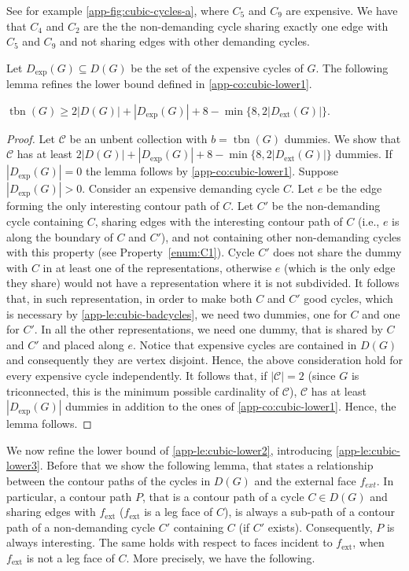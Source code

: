 \documentclass[runningheads]{llncs}
\newcommand{\tbn}{\operatorname{tbn}}
\newcommand{\ext}{\operatorname{ext}}
\begin{document}
See for example \cref{app-fig:cubic-cycles-a}, where $C_5$ and $C_9$ are expensive. We have that $C_4$ and $C_2$ are the the non-demanding cycle sharing exactly one edge with $C_5$ and $C_9$ and not sharing edges with other demanding cycles.

Let $D_{\exp}(G)\subseteq D(G)$ be the set of the expensive cycles of $G$. 
The following lemma refines the lower bound defined in \cref{app-co:cubic-lower1}.

\begin{lemma}
\label{app-le:cubic-lower2}
	$\tbn(G)\ge 2|D(G)|+|D_{\exp}(G)|+8-\min\{8, 2|D_{\ext}(G)|\}$.
\end{lemma}
\begin{proof}
Let $\mathcal{C}$ be an unbent collection with $b=\tbn(G)$ dummies.  We show that $\mathcal{C}$ has at least $2|D(G)|+|D_{\exp}(G)|+8-\min\{8, 2|D_{\ext}(G)|\}$ dummies. 
If $|D_{\exp}(G)|=0$ the lemma follows by 
\cref{app-co:cubic-lower1}. Suppose  $|D_{\exp}(G)|>0$.
Consider an expensive demanding cycle $C$. Let $e$ be the edge forming the only interesting contour path of $C$. %
Let $C'$ be the non-demanding cycle containing $C$, sharing edges with the interesting contour path of $C$ (i.e., $e$ is along the boundary of $C$ and $C'$), and not containing other non-demanding cycles with this property (see Property~\ref{enum:C1}). Cycle $C'$ does not share the dummy with $C$ in at least one of the representations, otherwise $e$ (which is the only edge they share) would not have a representation where it is not subdivided. It follows that, in such representation, in order to make both $C$ and $C'$ good cycles, which is necessary by \cref{app-le:cubic-badcycles}, we need two dummies, one for $C$ and one for $C'$. 
In all the other representations, we need one dummy, that is shared by $C$ and $C'$ and placed along $e$.
Notice that expensive cycles are contained in $D(G)$ and consequently they are vertex disjoint. Hence, the above consideration hold for every expensive cycle independently. It follows that, if $|\mathcal{C}|=2$ (since $G$ is triconnected, this is the minimum possible cardinality of $\mathcal{C}$), $\mathcal{C}$ has at least $|D_{\exp}(G)|$ dummies in addition to the ones of \cref{app-co:cubic-lower1}. Hence, the lemma follows.
\end{proof}




We now refine the lower bound of \cref{app-le:cubic-lower2}, introducing \cref{app-le:cubic-lower3}.  Before that we show the following lemma, that states a relationship between the contour paths of the cycles in $D(G)$ and the external face $f_{ext}$. In particular, a contour path $P$, that is a contour path of a cycle $C\in D(G)$ and sharing edges with $f_{\ext}$ ($f_{\ext}$ is a leg face of $C$), is always a sub-path of a contour path of a non-demanding cycle $C'$ containing $C$ (if $C'$ exists). Consequently, $P$ is always interesting. The same holds with respect to faces incident to $f_{\ext}$, when $f_{\ext}$ is not a leg face of $C$. More precisely, we have the following.
\end{document}
